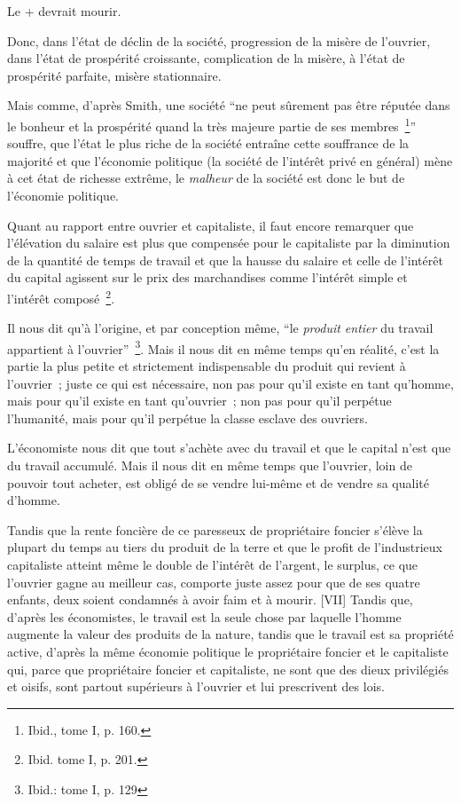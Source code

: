 \documentclass[french,twoside]{book} %
\begin{document}
\noindent Le + devrait mourir.\par
Donc, dans l’état de déclin de la société, progression de la misère de l’ouvrier, dans l’état de prospérité croissante, complication de la misère, à l’état de prospérité parfaite, misère stationnaire.\par
[VI] Mais comme, d’après Smith, une société “ne peut sûrement pas être réputée dans le bonheur et la prospérité quand la très majeure partie de ses membres \footnote{Ibid., tome I, p. 160.}” souffre, que l’état le plus riche de la société entraîne cette souffrance de la majorité et que l’économie politique (la société de l’intérêt privé en général) mène à cet état de richesse extrême, le \emph{malheur} de la société est donc le but de l’économie politique.\par
Quant au rapport entre ouvrier et capitaliste, il faut encore remarquer que l’élévation du salaire est plus que compensée pour le capitaliste par la diminution de la quantité de temps de travail et que la hausse du salaire et celle de l’intérêt du capital agissent sur le prix des marchandises comme l’intérêt simple et l’intérêt composé \footnote{Ibid. tome I, p. 201.}.\par
Il nous dit qu’à l’origine, et par conception même, “le \emph{produit entier} du travail appartient à l’ouvrier” \footnote{Ibid.: tome I, p. 129}. Mais il nous dit en même temps qu’en réalité, c’est la partie la plus petite et strictement indispensable du produit qui revient à l’ouvrier ; juste ce qui est nécessaire, non pas pour qu’il existe en tant qu’homme, mais pour qu’il existe en tant qu’ouvrier ; non pas pour qu’il perpétue l’humanité, mais pour qu’il perpétue la classe esclave des ouvriers.\par
L’économiste nous dit que tout s’achète avec du travail et que le capital n’est que du travail accumulé. Mais il nous dit en même temps que l’ouvrier, loin de pouvoir tout acheter, est obligé de se vendre lui-même et de vendre sa qualité d’homme.\par
Tandis que la rente foncière de ce paresseux de propriétaire foncier s’élève la plupart du temps au tiers du produit de la terre et que le profit de l’industrieux capitaliste atteint même le double de l’intérêt de l’argent, le surplus, ce que l’ouvrier gagne au meilleur cas, comporte juste assez pour que de ses quatre enfants, deux soient condamnés à avoir faim et à mourir. [VII] Tandis que, d’après les économistes, le travail est la seule chose par laquelle l’homme augmente la valeur des produits de la nature, tandis que le travail est sa propriété active, d’après la même économie politique le propriétaire foncier et le capitaliste qui, parce que propriétaire foncier et capitaliste, ne sont que des dieux privilégiés et oisifs, sont partout supérieurs à l’ouvrier et lui prescrivent des lois.\par
\end{document}
